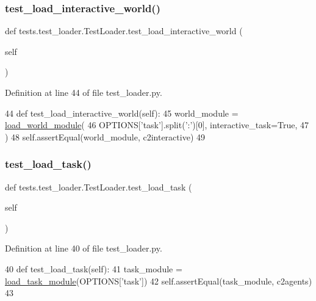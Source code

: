 \subsubsection{\texorpdfstring{test\+\_\+load\+\_\+interactive\+\_\+world()}{test\_load\_interactive\_world()}}
{\footnotesize\ttfamily def tests.\+test\+\_\+loader.\+Test\+Loader.\+test\+\_\+load\+\_\+interactive\+\_\+world (\begin{DoxyParamCaption}\item[{}]{self }\end{DoxyParamCaption})}



Definition at line 44 of file test\+\_\+loader.\+py.


\begin{DoxyCode}
44     \textcolor{keyword}{def }test\_load\_interactive\_world(self):
45         world\_module = \hyperlink{namespaceparlai_1_1core_1_1loader_adb9c272f49c31c45dcbc61d8e8c6316d}{load\_world\_module}(
46             OPTIONS[\textcolor{stringliteral}{'task'}].split(\textcolor{stringliteral}{':'})[0], interactive\_task=\textcolor{keyword}{True},
47         )
48         self.assertEqual(world\_module, c2interactive)
49 
\end{DoxyCode}
\mbox{\label{classtests_1_1test__loader_1_1TestLoader_af69bc77228b2955fc5b55099d7f1ce32}} 
\subsubsection{\texorpdfstring{test\+\_\+load\+\_\+task()}{test\_load\_task()}}
{\footnotesize\ttfamily def tests.\+test\+\_\+loader.\+Test\+Loader.\+test\+\_\+load\+\_\+task (\begin{DoxyParamCaption}\item[{}]{self }\end{DoxyParamCaption})}



Definition at line 40 of file test\+\_\+loader.\+py.


\begin{DoxyCode}
40     \textcolor{keyword}{def }test\_load\_task(self):
41         task\_module = \hyperlink{namespaceparlai_1_1core_1_1loader_a7ae3c6abd5c669634eb8940902735fc4}{load\_task\_module}(OPTIONS[\textcolor{stringliteral}{'task'}])
42         self.assertEqual(task\_module, c2agents)
43 
\end{DoxyCode}
\mbox{\label{classtests_1_1test__loader_1_1TestLoader_ae07019386f70e81a2963e2adba114d3a}} 
